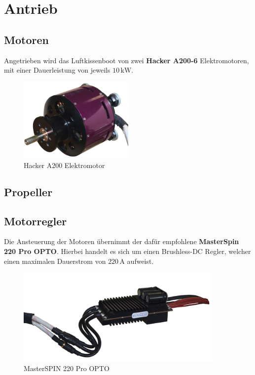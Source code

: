 \section{Antrieb}
\subsection{Motoren}
Angetrieben wird das Luftkissenboot von zwei \textbf{Hacker A200-6} Elektromotoren, mit einer Dauerleistung von jeweils $10\,\mathrm{kW}$.
\begin{figure}[h]
    \centering
    \includegraphics[width=0.5\textwidth]{Fotos/Motor.png}
    \caption{Hacker A200 Elektromotor}
\end{figure}
\newpage
\subsection{Propeller}



\newpage
\subsection{Motorregler}
Die Ansteuerung der Motoren übernimmt der dafür empfohlene \textbf{MasterSpin 220 Pro OPTO}.
Hierbei handelt es sich um einen Brushless-DC Regler, welcher einen maximalen Dauerstrom von $220\,\mathrm{A}$ aufweist.
\begin{figure}[h]
    \centering
    \includegraphics[width=0.9\textwidth]{Fotos/MasterSpin_ohne_Halter.png}
    \caption{MasterSPIN 220 Pro OPTO}
\end{figure}

